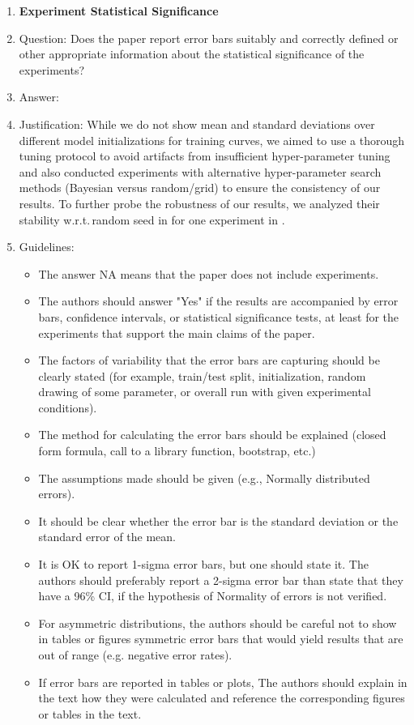 \begin{enumerate}
\item {\bf Experiment Statistical Significance}
\item[] Question: Does the paper report error bars suitably and correctly defined or other appropriate information about the statistical significance of the experiments?
\item[] Answer: \answerYes{}
\item[] Justification: While we do not show mean and standard deviations over different model initializations for training curves, we aimed to use a thorough tuning protocol to avoid artifacts from insufficient hyper-parameter tuning and also conducted experiments with alternative hyper-parameter search methods (Bayesian versus random/grid) to ensure the consistency of our results.
  To further probe the robustness of our results, we analyzed their stability w.r.t.\,random seed in for one experiment in .
\item[] Guidelines:
  \begin{itemize}
  \item The answer NA means that the paper does not include experiments.
  \item The authors should answer "Yes" if the results are accompanied by error bars, confidence intervals, or statistical significance tests, at least for the experiments that support the main claims of the paper.
  \item The factors of variability that the error bars are capturing should be clearly stated (for example, train/test split, initialization, random drawing of some parameter, or overall run with given experimental conditions).
  \item The method for calculating the error bars should be explained (closed form formula, call to a library function, bootstrap, etc.)
  \item The assumptions made should be given (e.g., Normally distributed errors).
  \item It should be clear whether the error bar is the standard deviation or the standard error of the mean.
  \item It is OK to report 1-sigma error bars, but one should state it. The authors should preferably report a 2-sigma error bar than state that they have a 96\% CI, if the hypothesis of Normality of errors is not verified.
  \item For asymmetric distributions, the authors should be careful not to show in tables or figures symmetric error bars that would yield results that are out of range (e.g. negative error rates).
  \item If error bars are reported in tables or plots, The authors should explain in the text how they were calculated and reference the corresponding figures or tables in the text.
  \end{itemize}


\end{enumerate}
